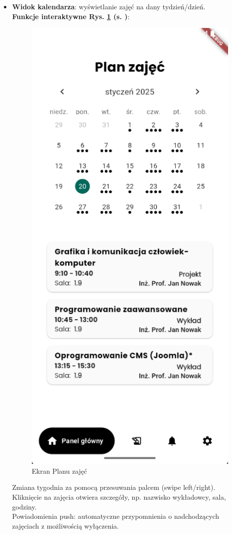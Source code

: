 \begin{itemize}
      \item \textbf{Widok kalendarza}: wyświetlanie zajęć na dany tydzień/dzień.
            \\\textbf{Funkcje interaktywne Rys. \ref{rys:ekranplanzajec} (s. \pageref{rys:ekranplanzajec})}:
            \begin{figure}[htb!]
                  \centering
                  \includegraphics[width=0.55\linewidth]{rys/ekranplanzajec.png}
                  \caption{Ekran Planu zajęć}
                  \label{rys:ekranplanzajec}
            \end{figure}
            \newpage
            Zmiana tygodnia za pomocą przesuwania palcem (swipe left/right).
            \\Kliknięcie na zajęcia otwiera szczegóły, np. nazwisko wykładowcy, sala, godziny.
            \\Powiadomienia push: automatyczne przypomnienia o nadchodzących zajęciach z możliwością wyłączenia.


\end{itemize}
